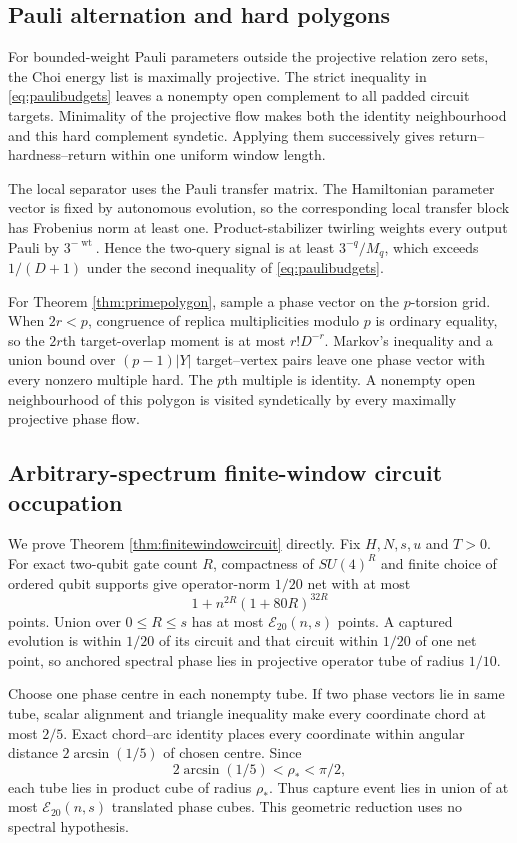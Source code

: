 \subsection{Pauli alternation and hard polygons}

For bounded-weight Pauli parameters outside the projective relation zero
sets, the Choi energy list is maximally projective.  The strict inequality
in \eqref{eq:paulibudgets} leaves a nonempty open complement to all padded
circuit targets.  Minimality of the projective flow makes both the identity
neighbourhood and this hard complement syndetic.  Applying them successively
gives return--hardness--return within one uniform window length.

The local separator uses the Pauli transfer matrix.  The Hamiltonian
parameter vector is fixed by autonomous evolution, so the corresponding
local transfer block has Frobenius norm at least one.  Product-stabilizer
twirling weights every output Pauli by $3^{-\operatorname{wt}}$.  Hence the
two-query signal is at least $3^{-q}/M_q$, which exceeds $1/(D+1)$ under the
second inequality of \eqref{eq:paulibudgets}.

For Theorem \ref{thm:primepolygon}, sample a phase vector on the $p$-torsion
grid.  When $2r<p$, congruence of replica multiplicities modulo $p$ is
ordinary equality, so the $2r$th target-overlap moment is at most
$r!D^{-r}$.  Markov's inequality and a union bound over
$(p-1)|Y|$ target--vertex pairs leave one phase vector with every nonzero
multiple hard.  The $p$th multiple is identity.  A nonempty open
neighbourhood of this polygon is visited syndetically by every maximally
projective phase flow.

\subsection{Arbitrary-spectrum finite-window circuit occupation}

We prove Theorem \ref{thm:finitewindowcircuit} directly.  Fix $H,N,s,u$ and
$T>0$.  For exact two-qubit gate count $R$, compactness of $SU(4)^R$ and
finite choice of ordered qubit supports give operator-norm $1/20$ net with at
most
\[
 1+n^{2R}(1+80R)^{32R}
\]
points.  Union over $0\le R\le s$ has at most
$\mathcal E_{20}(n,s)$ points.  A captured evolution is within $1/20$ of its
circuit and that circuit within $1/20$ of one net point, so anchored spectral
phase lies in projective operator tube of radius $1/10$.

Choose one phase centre in each nonempty tube.  If two phase vectors lie in
same tube, scalar alignment and triangle inequality make every coordinate
chord at most $2/5$.  Exact chord--arc identity places every coordinate within
angular distance $2\arcsin(1/5)$ of chosen centre.  Since
\[
 2\arcsin(1/5)<\rho_*<\pi/2,
\]
each tube lies in product cube of radius $\rho_*$.  Thus capture event lies in
union of at most $\mathcal E_{20}(n,s)$ translated phase cubes.  This geometric
reduction uses no spectral hypothesis.

